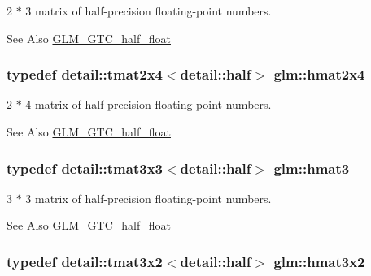 2 $\ast$ 3 matrix of half-\/precision floating-\/point numbers. 

\begin{DoxySeeAlso}{See Also}
\hyperlink{group__gtc__half__float}{G\-L\-M\-\_\-\-G\-T\-C\-\_\-half\-\_\-float} 
\end{DoxySeeAlso}
\hypertarget{group__gtc__half__float_gae4525d297f7612882ac1e58ad938ac10}{
\subsubsection[{hmat2x4}]{\setlength{\rightskip}{0pt plus 5cm}typedef detail\-::tmat2x4$<$detail\-::half$>$ {\bf glm\-::hmat2x4}}}\label{group__gtc__half__float_gae4525d297f7612882ac1e58ad938ac10}


2 $\ast$ 4 matrix of half-\/precision floating-\/point numbers. 

\begin{DoxySeeAlso}{See Also}
\hyperlink{group__gtc__half__float}{G\-L\-M\-\_\-\-G\-T\-C\-\_\-half\-\_\-float} 
\end{DoxySeeAlso}
\hypertarget{group__gtc__half__float_gacbd67f9ac28573409d5d1eede2ec0fcd}{
\subsubsection[{hmat3}]{\setlength{\rightskip}{0pt plus 5cm}typedef detail\-::tmat3x3$<$detail\-::half$>$ {\bf glm\-::hmat3}}}\label{group__gtc__half__float_gacbd67f9ac28573409d5d1eede2ec0fcd}


3 $\ast$ 3 matrix of half-\/precision floating-\/point numbers. 

\begin{DoxySeeAlso}{See Also}
\hyperlink{group__gtc__half__float}{G\-L\-M\-\_\-\-G\-T\-C\-\_\-half\-\_\-float} 
\end{DoxySeeAlso}
\hypertarget{group__gtc__half__float_ga70ae0376caa86bce1c8df390c7211321}{
\subsubsection[{hmat3x2}]{\setlength{\rightskip}{0pt plus 5cm}typedef detail\-::tmat3x2$<$detail\-::half$>$ {\bf glm\-::hmat3x2}}}\label{group__gtc__half__float_ga70ae0376caa86bce1c8df390c7211321}


